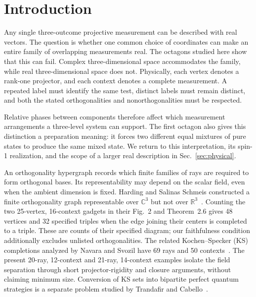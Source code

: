 \documentclass[12pt,a4paper]{article}
\theoremstyle{definition}
\theoremstyle{remark}
\newcommand{\C}{\mathbb C}
\newcommand{\R}{\mathbb R}
\begin{document}
\section{Introduction}

Any single three-outcome projective measurement can be described with real
vectors.  The question is whether one common choice of coordinates can
make an entire family of overlapping measurements real.  The octagons
studied here show that this can fail.  Complex three-dimensional space
accommodates the family, while real three-dimensional space does not.
Physically, each vertex denotes a rank-one projector, and each context
denotes a complete measurement.  A repeated label must identify the same
test, distinct labels must remain distinct, and both the stated
orthogonalities and nonorthogonalities must be respected.

Relative phases between components therefore affect which measurement
arrangements a three-level system can support.  The first octagon also gives this
distinction a preparation meaning: it forces two different equal mixtures
of pure states to produce the same mixed state.  We return to this
interpretation, its spin-1 realization, and the scope of a larger real
description in Sec.~\ref{sec:physical}.

An orthogonality hypergraph records which finite families of rays are required
to form orthogonal bases.  Its representability may depend on the scalar field,
even when the ambient dimension is fixed.  Harding and Salinas Schmeis
constructed a finite orthogonality graph representable over $\C^3$ but not
over $\R^3$~\cite{harding2025remarksIJTP}.  Counting the two 25-vertex,
16-context gadgets in their Fig.~2 and Theorem~2.6 gives 48 vertices and
32 specified triples when the edge joining their centers is completed to
a triple.  These are counts of their specified diagram; our faithfulness
condition additionally excludes unlisted orthogonalities.  The related
Kochen--Specker (KS) completions analyzed by Navara and Svozil have 69 rays
and 50 contexts~\cite{svozil-2025-MYOCHS}.  The present 20-ray, 12-context
and 21-ray, 14-context examples isolate the field separation through short
projector-rigidity and closure arguments, without claiming minimum size.
Conversion of KS sets into bipartite perfect quantum strategies is a
separate problem studied by Trandafir and Cabello~\cite{2024-cabello-trandafir0}.
\end{document}
